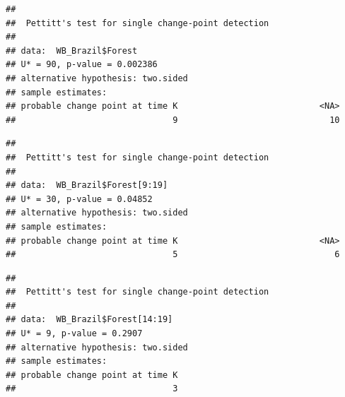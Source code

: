 \documentclass[12pt,]{article}
\newenvironment{Shaded}{\begin{snugshade}}{\end{snugshade}}
\newcommand{\KeywordTok}[1]{\textcolor[rgb]{0.13,0.29,0.53}{\textbf{#1}}}
\newcommand{\DecValTok}[1]{\textcolor[rgb]{0.00,0.00,0.81}{#1}}
\newcommand{\CommentTok}[1]{\textcolor[rgb]{0.56,0.35,0.01}{\textit{#1}}}
\newcommand{\OperatorTok}[1]{\textcolor[rgb]{0.81,0.36,0.00}{\textbf{#1}}}
\newcommand{\NormalTok}[1]{#1}
\begin{document}
\begin{verbatim}
## 
##  Pettitt's test for single change-point detection
## 
## data:  WB_Brazil$Forest
## U* = 90, p-value = 0.002386
## alternative hypothesis: two.sided
## sample estimates:
## probable change point at time K                            <NA> 
##                               9                              10
\end{verbatim}

\begin{Shaded}
\end{Shaded}

\begin{verbatim}
## 
##  Pettitt's test for single change-point detection
## 
## data:  WB_Brazil$Forest[9:19]
## U* = 30, p-value = 0.04852
## alternative hypothesis: two.sided
## sample estimates:
## probable change point at time K                            <NA> 
##                               5                               6
\end{verbatim}

\begin{Shaded}
\end{Shaded}

\begin{verbatim}
## 
##  Pettitt's test for single change-point detection
## 
## data:  WB_Brazil$Forest[14:19]
## U* = 9, p-value = 0.2907
## alternative hypothesis: two.sided
## sample estimates:
## probable change point at time K 
##                               3
\end{verbatim}

\begin{Shaded}
\end{Shaded}
\end{document}
